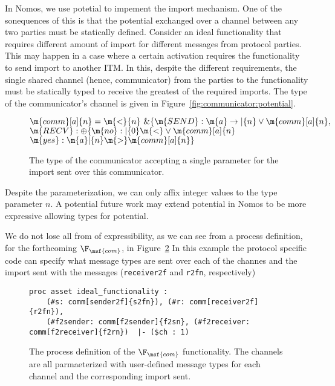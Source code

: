 In Nomos, we use potetial to impement the import mechanism.
One of the sonequences of this is that the potential exchanged over a channel between any two parties must be statically defined.
Consider an ideal functionality that requires different amount of import for different messages from protocol parties. 
This may happen in a case where a certain activation requires the functionality to send import to another ITM.
In this, despite the different requirements, the single shared channel (hence, communicator) from the parties to the functionality must be statically typed to receive the greatest of the required imports.
The type of the communicator's channel is given in Figure~\ref{fig:communicator:potential}.
\begin{figure}
\begin{sill}
$\m{comm}[a]\{n\} = \m{<}\{n\}~ \& \{ \m{SEND}: \m{a} \rightarrow |\{n\} \vee \m{comm}[a]\{n\},$ \\
\qquad \qquad \qquad \qquad $\m{RECV}: \oplus\{ \m{no}: |\{0\}\m{<} \vee \m{comm}[a]\{n\}$ \\
\qquad \qquad \qquad \qquad \qquad \qquad \quad $\m{yes}: \m{a} \* |\{n\}\m{>} \m{comm}[a]\{n\}\}$
\end{sill}
\caption{The type of the communicator accepting a single parameter for the import sent over this communicator.}
\label{fig:nomos:communicator:potential}
\end{figure}
Despite the parameterization, we can only affix integer values to the type parameter $n$.
A potential future work may extend potential in Nomos to be more expressive allowing types for potential. 

We do not lose all from of expressibility, as we can see from a process definition, for the forthcoming $\F_{\msf{com}}$, in Figure~\ref{fig:fcom:proc}
In this example the protocol specific code can specify what message types are sent over each of the channes and the import sent with the messages (\texttt{receiver2f} and \texttt{r2fn}, respectively)

\begin{figure*}[!ht]
\begin{lstlisting}[basicstyle=\small\ttfamily,frame=single]
proc asset ideal_functionality :
    (#s: comm[sender2f]{s2fn}), (#r: comm[receiver2f]{r2fn}), 
    (#f2sender: comm[f2sender]{f2sn}, (#f2receiver: comm[f2receiver]{f2rn})  |- ($ch : 1)
\end{lstlisting}
\caption{The process definition of the $\F_{\msf{com}}$ functionality. The channels are all parmaeterized with user-defined message types for each channel and the corresponding import sent.}
\label{fig:fcom:proc}
\end{figure*}
